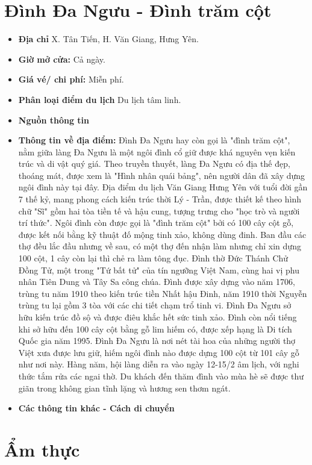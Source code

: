 \documentclass{article}
\begin{document}
\section{Đình Đa Ngưu - Đình trăm cột}
\begin{itemize}
    \item{\textbf{Địa chỉ}} X. Tân Tiến, H. Văn Giang, Hưng Yên.

    \item{\textbf{Giờ mở cửa:}} Cả ngày.

    \item{\textbf{Giá vé/ chi phí:}} Miễn phí.

    \item{\textbf{Phân loại điểm du lịch}} Du lịch tâm linh.

    \item{\textbf{Nguồn thông tin}} 

    \item{\textbf{Thông tin về địa điểm:}} Đình Đa Ngưu hay còn gọi là "đình trăm cột", nằm giữa làng Đa Ngưu là một ngôi đình cổ giữ được khá nguyên vẹn kiến trúc và di vật quý giá. Theo truyền thuyết, làng Đa Ngưu có địa thế đẹp, thoáng mát, được xem là "Hình nhân quái bảng", nên người dân đã xây dựng ngôi đình này tại đây. Địa điểm du lịch Văn Giang Hưng Yên với tuổi đời gần 7 thế kỷ, mang phong cách kiến trúc thời Lý - Trần, được thiết kế theo hình chữ "Sĩ" gồm hai tòa tiền tế và hậu cung, tượng trưng cho "học trò và người trí thức". Ngôi đình còn được gọi là "đình trăm cột" bởi có 100 cây cột gỗ, được kết nối bằng kỹ thuật đố mộng tinh xảo, không dùng đinh. Ban đầu các thợ đều lắc đầu nhưng về sau, có một thợ đến nhận làm nhưng chỉ xin dựng 100 cột, 1 cây còn lại thì chẻ ra làm tông đục. Đình thờ Đức Thánh Chử Đồng Tử, một trong "Tứ bất tử" của tín ngưỡng Việt Nam, cùng hai vị phu nhân Tiên Dung và Tây Sa công chúa. Đình được xây dựng vào năm 1706, trùng tu năm 1910 theo kiến trúc tiền Nhất hậu Đinh, năm 1910 thời Nguyễn trùng tu lại gồm 3 tòa với các chi tiết chạm trổ tinh vi. Đình Đa Ngưu sở hữu kiến trúc đồ sộ và được điêu khắc hết sức tinh xảo. Đình còn nổi tiếng khi sở hữu đến 100 cây cột bằng gỗ lim hiếm có, được xếp hạng là Di tích Quốc gia năm 1995. Đình Đa Ngưu là nơi nét tài hoa của những người thợ Việt xưa được lưu giữ, hiếm ngôi đình nào được dựng 100 cột từ 101 cây gỗ như nơi này. Hàng năm, hội làng diễn ra vào ngày 12-15/2 âm lịch, với nghi thức tắm rửa các ngai thờ. Du khách đến thăm đình vào mùa hè sẽ được thư giãn trong không gian tĩnh lặng và hương sen thơm ngát.
\end{itemize}

\begin{itemize}
    \item{\textbf{Các thông tin khác - Cách di chuyển}} 
\end{itemize}


\newpage
\section*{{Ẩm thực}}
\setcounter{section}{0}
\end{document}
